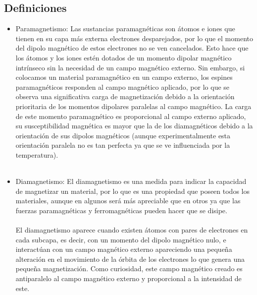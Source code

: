 \documentclass[11pt,letterpaper,twocolumn]{article}
\begin{document}
\subsection{Definiciones}
\begin{itemize}

	\item Paramagnetismo: Las sustancias paramagnéticas son  átomos e iones que tienen en su capa más externa electrones desparejados, por lo que el momento del dipolo magnético de estos electrones no se ven cancelados. Esto hace que los átomos y los iones estén dotados de un momento dipolar magnético intrínseco sin la necesidad de un campo magnético externo. Sin embargo, si colocamos un material paramagnético en un campo externo, los espines paramagnéticos responden al campo magnético aplicado, por lo que se observa una significativa carga de magnetización debido a la orientación prioritaria de los momentos dipolares paralelas al campo magnético. La carga de este momento paramagnético es proporcional al campo externo aplicado, su susceptibilidad magnética es mayor que la de los diamagnéticos debido a la orientación de sus dipolos magnéticos (aunque experimentalmente esta orientación paralela no es tan perfecta ya que se ve influenciada por la temperatura). \\
\\


\item Diamagnetismo:  El diamagnetismo es una medida para indicar la capacidad de magnetizar un material, por lo que es una propiedad que poseen todos los materiales, aunque en algunos será más apreciable que en otros ya que las fuerzas  paramagnéticas y ferromagnéticas pueden hacer que se disipe. \\
	\\
El diamagnetismo aparece cuando existen átomos con pares de electrones en cada subcapa, es decir, con un momento del dipolo magnético nulo, e interactúan con un campo magnético externo apareciendo una pequeña alteración en el movimiento de la órbita de los electrones lo que genera  una pequeña magnetización. Como curiosidad, este campo magnético creado es antiparalelo al campo magnético externo y proporcional a la intensidad de este.\\
\\



\end{itemize}
\end{document}
